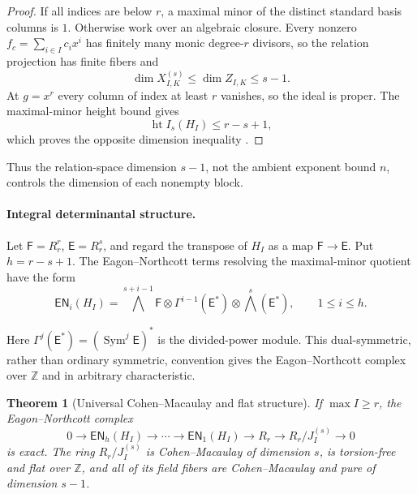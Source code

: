 \documentclass[10pt,fleqn]{article}
\numberwithin{equation}{section}
\newtheorem{theorem}{Theorem}[section]
\newcommand{\sym}{\operatorname{Sym}}
\begin{document}
\begin{proof}
If all indices are below $r$, a maximal minor of the distinct standard
basis columns is $1$.  Otherwise work over an algebraic closure.
Every nonzero $f_c=\sum_{i\in I}c_ix^i$ has finitely many monic
degree-$r$ divisors, so the relation projection has finite fibers and
\begin{equation}\label{eq:incidence-upper}
 \dim X_{I,K}^{(s)}\le\dim Z_{I,K}\le s-1.
\end{equation}
At $g=x^r$ every column of index at least $r$ vanishes, so the ideal
is proper.  The maximal-minor height bound gives
\begin{equation}\label{eq:det-height-bound}
 \operatorname{ht}I_s(H_I)\le r-s+1,
\end{equation}
which proves the opposite dimension inequality
\cite{EagonNorthcott,BrunsVetter}.
\end{proof}

Thus the relation-space dimension $s-1$, not the ambient exponent bound
$n$, controls the dimension of each nonempty block.

\paragraph{Integral determinantal structure.}

Let $\mathsf F=R_r^r$, $\mathsf E=R_r^s$, and regard the transpose of $H_I$ as a map $\mathsf F\to \mathsf E$.  Put
$h=r-s+1$.  The Eagon--Northcott terms resolving the maximal-minor quotient have the form
\begin{equation}\label{eq:EN-terms}
 \mathsf{EN}_i(H_I)=
 \bigwedge^{s+i-1}\mathsf F\otimes\Gamma^{i-1}(\mathsf E^*)\otimes\bigwedge^s(\mathsf E^*),
 \qquad 1\le i\le h.
\end{equation}

Here $\Gamma^j(\mathsf E^*)=(\sym^j \mathsf E)^*$ is the divided-power module.  This dual-symmetric,
rather than ordinary symmetric, convention gives the Eagon--Northcott complex over
$\mathbb Z$ and in arbitrary characteristic.

\begin{theorem}[Universal Cohen--Macaulay and flat structure]\label{thm:CM-flat}
If $\max I\ge r$, the Eagon--Northcott complex
\begin{equation}\label{eq:EN-resolution}
 0\longrightarrow\mathsf{EN}_h(H_I)\longrightarrow\cdots
 \longrightarrow\mathsf{EN}_1(H_I)\longrightarrow R_r
 \longrightarrow R_r/J_I^{(s)}\longrightarrow0
\end{equation}
is exact.  The ring $R_r/J_I^{(s)}$ is Cohen--Macaulay of dimension $s$, is torsion-free and
flat over $\mathbb Z$, and all of its field fibers are Cohen--Macaulay and pure of dimension
$s-1$.
\end{theorem}
\end{document}
